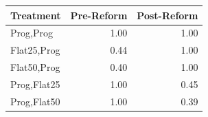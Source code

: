 \begin{tabular}{lrr}
\toprule
Treatment & Pre-Reform & Post-Reform \\
\midrule
Prog,Prog & 1.00 & 1.00 \\
Flat25,Prog & 0.44 & 1.00 \\
Flat50,Prog & 0.40 & 1.00 \\
Prog,Flat25 & 1.00 & 0.45 \\
Prog,Flat50 & 1.00 & 0.39 \\
\bottomrule
\end{tabular}

